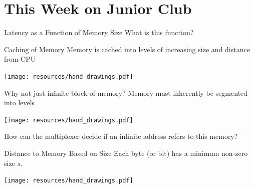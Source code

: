 \documentclass{beamer}
\begin{document}
\section{This Week on Junior Club}

\begin{frame}{Latency as a Function of Memory Size}
What is this function?
\end{frame}

\begin{frame}{Caching of Memory}
Memory is cached into levels of increasing size and distance from CPU

\begin{center}
\texttt{[image: resources/hand\_drawings.pdf]}
\end{center}
\end{frame}

\begin{frame}{Why not just infinite block of memory?}
Memory must inherently be segmented into levels

\begin{center}
\texttt{[image: resources/hand\_drawings.pdf]}
\end{center}

How can the multiplexer decide if an infinite address refers to this memory?
\end{frame}

\begin{frame}{Distance to Memory Based on Size}
Each byte (or bit) has a minimum non-zero size $s$.

\begin{center}
\texttt{[image: resources/hand\_drawings.pdf]}
\end{center}
\end{frame}
\end{document}
